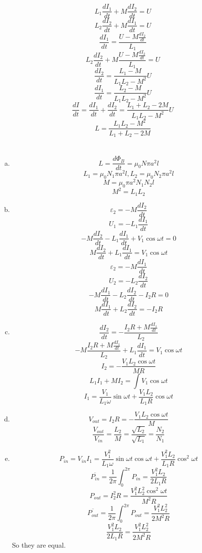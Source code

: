 \documentclass{article}
\begin{document}
\section{}
$$L_1\frac{dI_1}{dt}+M\frac{dI_2}{dt}=U$$
$$L_2\frac{dI_2}{dt}+M\frac{dI_1}{dt}=U$$
$$\frac{dI_1}{dt}=\frac{U-M\frac{dI_2}{dt}}{L_1}$$
$$L_2\frac{dI_2}{dt}+M\frac{U-M\frac{dI_2}{dt}}{L_1}=U$$
$$\frac{dI_2}{dt}=\frac{L_1-M}{L_1L_2-M^2}U$$
$$\frac{dI_1}{dt}=\frac{L_2-M}{L_1L_2-M^2}U$$
$$\frac{dI}{dt}=\frac{dI_1}{dt}+\frac{dI_2}{dt}=\frac{L_1+L_2-2M}{L_1L_2-M^2}U$$
$$L=\frac{L_1L_2-M^2}{L_1+L_2-2M}$$

\section{}
\begin{enumerate}[(a)]
\item
$$L=\frac{d\Phi_B}{dt}=\mu_0N\pi a^2l$$
$$L_1=\mu_0N_1\pi a^2l,L_2=\mu_0N_2\pi a^2l$$
$$M=\mu_0\pi a^2N_1N_2l$$
$$M^2=L_1L_2$$
\item
$$\varepsilon_2=-M\frac{dI_2}{dt}$$
$$U_1=-L_1\frac{dI_1}{dt}$$
$$-M\frac{dI_2}{dt}-L_1\frac{dI_1}{dt}+V_1\cos\omega t=0$$
$$M\frac{dI_2}{dt}+L_1\frac{dI_1}{dt}=V_1\cos\omega t$$
$$\varepsilon_2=-M\frac{dI_1}{dt}$$
$$U_2=-L_2\frac{dI_2}{dt}$$
$$-M\frac{dI_1}{dt}-L_2\frac{dI_2}{dt}-I_2R=0$$
$$M\frac{dI_1}{dt}+L_2\frac{dI_2}{dt}=-I_2R$$
\item
$$\frac{dI_2}{dt}=-\frac{I_2R+M\frac{dI_1}{dt}}{L_2}$$
$$-M\frac{I_2R+M\frac{dI_1}{dt}}{L_2}+L_1\frac{dI_1}{dt}=V_1\cos\omega t$$
$$I_2=-\frac{V_1L_2\cos\omega t}{MR}$$
$$L_1I_1+MI_2=\int V_1\cos\omega t$$
$$I_1=\frac{V_1}{L_1\omega}\sin\omega t+\frac{V_1L_2}{L_1R}\cos\omega t$$
\item
$$V_{out}=I_2R=-\frac{V_1L_2\cos\omega t}{M}$$
$$\frac{V_{out}}{V_{in}}=\frac{L_2}{M}=\frac{\sqrt{L_2}}{\sqrt{L_1}}=\frac{N_2}{N_1}$$
\item
$$P_{in}=V_{in}I_1=\frac{V_1^2}{L_1\omega}\sin\omega t\cos\omega t+\frac{V_1^2L_2}{L_1R}\cos^2\omega t$$
$$\overline{P_{in}}=\frac{1}{2\pi}\int_0^{2\pi}P_{in}=\frac{V_1^2L_2}{2L_1R}$$
$$P_{out}=I_2^2R=\frac{V_1^2L_2^2\cos^2\omega t}{M^2R}$$
$$\overline{P_{out}}=\frac{1}{2\pi}\int_0^{2\pi}P_{out}=\frac{V_1^2L_2^2}{2M^2R}$$
$$\frac{V_1^2L_2}{2L_1R}=\frac{V_1^2L_2^2}{2M^2R}$$
So they are equal.
\end{enumerate}
\end{document}
